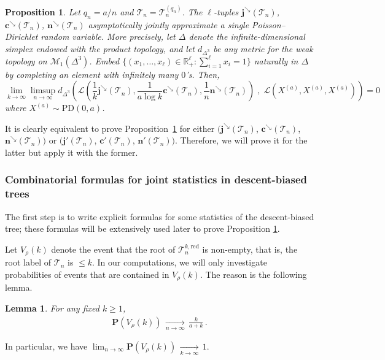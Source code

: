 \documentclass{article}
\newtheorem{lemma}[theorem]{Lemma}
\newtheorem{proposition}[theorem]{Proposition}
\theoremstyle{remark}
\newcommand{\bR}{\mathbb{R}}
\newcommand{\cv}[1]{\,\underset{#1}{\longrightarrow}\,}
\newcommand{\cT}{\mathcal{T}}
\newcommand{\cM}{\mathcal{M}}
\newcommand{\bc}{\mathbf{c}}
\newcommand{\bj}{\mathbf{j}}
\newcommand{\bn}{\mathbf{n}}
\newcommand{\prob}[1]{\mathbf{P}{\left(#1\right)}}
\newcommand{\Law}[1]{\mathcal{L}{\left(#1\right)}}
\newcommand{\PoissonDirichlet}[2]{\mathrm{PD}{\left(#1,#2\right)}}
\newcommand{\red}{\mathrm{red}}
\begin{document}
\begin{proposition}\label{prop: joint convergence of tilde j tilde c tilde n towards PoissonDirichlet}
Let $q_n=a/n$ and $\cT_n = \cT_n^{(q_n)}$.
The $\ell$-tuples $\bj^\searrow(\cT_n)$, $\bc^\searrow(\cT_n)$, $\bn^\searrow(\cT_n)$ asymptotically jointly approximate a single Poisson--Dirichlet random variable.
More precisely, let $\Delta$ denote the infinite-dimensional simplex endowed with the product topology, and let $d_{\Delta^3}$ be any metric for the weak topology on $\cM_1(\Delta^3)$. 
Embed 
$\{(x_1,\ldots,x_\ell) \in \bR_+^\ell : \sum_{i=1}^\ell x_i = 1\}$
naturally in $\Delta$ by completing an element with infinitely many $0$'s. Then,
    \begin{equation*}
        \lim_{k\to\infty} \limsup_{n\to\infty} 
        d_{\Delta^3}{\left( \Law{ \frac1k\bj^\searrow(\cT_n) , \frac{1}{a\log k} \bc^\searrow(\cT_n) , \frac1n \bn^\searrow(\cT_n) } \;,\; \Law{ X^{(a)} , X^{(a)} , X^{(a)} } \right)} 
        = 0
    \end{equation*}
    where $X^{(a)} \sim \PoissonDirichlet{0}{a}$.
\end{proposition}

It is clearly equivalent to prove Proposition~\ref{prop: joint convergence of tilde j tilde c tilde n towards PoissonDirichlet} for either $(\bj^\searrow(\cT_n)$, $\bc^\searrow(\cT_n)$, $\bn^\searrow(\cT_n))$ or $(\bj'(\cT_n)$, $\bc'(\cT_n)$, $\bn'(\cT_n))$.
Therefore, we will prove it for the latter but apply it with the former.


\subsubsection{Combinatorial formulas for joint statistics in descent-biased trees}

The first step is to write explicit formulas for some statistics of the descent-biased tree; these formulas will be extensively used later to prove Proposition \ref{prop: joint convergence of tilde j tilde c tilde n towards PoissonDirichlet}.

Let $V_\rho(k)$ denote the event that the root of $\cT_n^{k,\red}$ is non-empty, that is, the root label of $\cT_n$ is $\le k$. 
In our computations, we will only investigate probabilities of events that are contained in $V_\rho(k)$. The reason is the following lemma.

\begin{lemma}\label{lem: asymptotic probability of V1}
For any fixed $k\ge1$,
\begin{align*}
    \prob{V_\rho(k)} \cv{n\to\infty} \frac{k}{a+k} \,.
\end{align*}
\end{lemma}
\noindent
In particular, we have $\lim_{n\to\infty} \prob{V_\rho(k)} \cv{k\to\infty} 1$.
\end{document}
